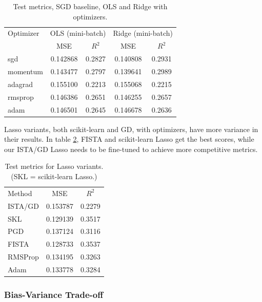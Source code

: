\documentclass[amssymb,twocolumn,aps]{revtex4-2}
\begin{document}
\begin{table}[h!]
\caption{Test metrics, SGD baseline, OLS and Ridge with optimizers.}
\label{tab:mb-optimizers-1000}
\begin{ruledtabular}
\begin{tabular}{lcccc} 
Optimizer & \multicolumn{2}{c}{OLS (mini-batch)} & \multicolumn{2}{c}{Ridge (mini-batch)} \\
\colrule
 & MSE & $R^2$ & MSE & $R^2$ \\
\colrule
sgd       & 0.142868 & 0.2827 & 0.140808 & 0.2931 \\
momentum  & 0.143477 & 0.2797 & 0.139641 & 0.2989 \\
adagrad   & 0.155100 & 0.2213 & 0.155068 & 0.2215 \\
rmsprop   & 0.146386 & 0.2651 & 0.146255 & 0.2657 \\
adam      & 0.146501 & 0.2645 & 0.146678 & 0.2636 \\
\end{tabular}
\end{ruledtabular}
\end{table}

Lasso variants, both scikit-learn and GD, with optimizers, have more variance in their results. In table \ref{tab:lasso-variants}, FISTA and scikit-learn Lasso get the best scores, while our ISTA/GD Lasso needs to be fine-tuned to achieve more competitive metrics. 

\begin{table}[h!]
\caption{Test metrics for Lasso variants. (SKL = scikit-learn Lasso.)}
\label{tab:lasso-variants}
\begin{ruledtabular}
\begin{tabular}{lcc}
Method & MSE & $R^2$ \\
\colrule
ISTA/GD    & 0.153787 & 0.2279 \\
SKL     & 0.129139 & 0.3517 \\
PGD     & 0.137124 & 0.3116 \\
FISTA   & 0.128733 & 0.3537 \\
RMSProp & 0.134195 & 0.3263 \\
Adam    & 0.133778 & 0.3284 \\
\end{tabular}
\end{ruledtabular}
\end{table}


\subsubsection{Bias-Variance Trade-off}
\end{document}
